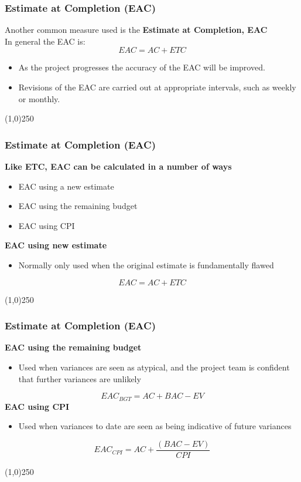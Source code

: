 \begin{frame}
\frametitle{Estimate at Completion (EAC)}
Another common measure used is the \textbf{Estimate at Completion, EAC}\\
In general the EAC is:
\[
	EAC = AC + ETC
\]	
\begin{itemize}
	\item As the project progresses the accuracy of the EAC will be improved.
	\item Revisions of the EAC are carried out at appropriate intervals, such as weekly or monthly.
\end{itemize}
\end{frame}
\begin{center}\line(1,0){250}\end{center}






\begin{frame}
\frametitle{Estimate at Completion (EAC)}
\textbf{Like ETC, EAC can be calculated in a number of ways}
\begin{itemize}
	\item EAC using a new estimate
	\item EAC using the remaining budget
	\item EAC using CPI
\end{itemize}
\textbf{EAC using new estimate}
\begin{itemize}
	\item Normally only used when the original estimate is fundamentally flawed
\end{itemize}
\[
		EAC = AC + ETC
\]
\end{frame}
\begin{center}\line(1,0){250}\end{center}






\begin{frame}
\frametitle{Estimate at Completion (EAC)}
\textbf{EAC using the remaining budget}
\begin{itemize}
	\item Used when variances are seen as atypical, and the project team is confident that further variances are unlikely
\end{itemize}
\[
		EAC_{BGT} = AC + BAC - EV
\]
\textbf{EAC using CPI}
\begin{itemize}
	\item Used when variances to date are seen as being indicative of future variances
\end{itemize}
\[
		EAC_{CPI} = AC + \frac{(BAC - EV)}{CPI}
\]
\end{frame}
\begin{center}\line(1,0){250}\end{center}






